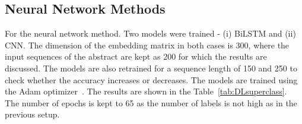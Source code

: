 \begin{table}[!htb]
    \centering
    \caption{Results of predicting super class using Bag of words feature selection}
    \label{tab:resultsBOW}
\end{table}

\subsection{Neural Network Methods}
For the neural network method.  Two models were trained - (i) BiLSTM and (ii)
CNN. The dimension of the embedding matrix in both cases is 300, where the input sequences of the abstract
are kept as 200 for which the results are discussed. The models are also retrained
for a sequence length of 150 and 250 to check whether the accuracy increases or
decreases. The models are trained using the Adam optimizer~\cite{kingma2014adam}. The results are shown in the Table~\ref{tab:DLsuperclass}. The number of epochs is kept to 65 as the number of labels is not high as in the previous setup. 

